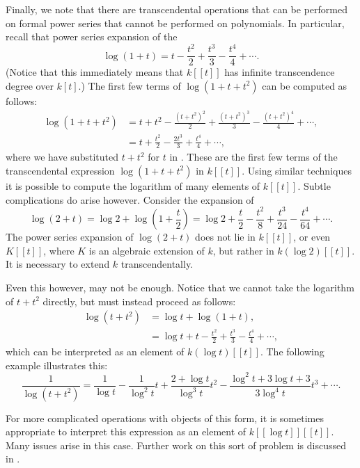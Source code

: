 \smallskip
Finally, we note that there are transcendental operations that can be
performed on formal power series that cannot be performed on
polynomials.  In particular, recall that power series expansion of the
\begin{equation} \label{Series:Log:Eq}
\log (1 + t) = t - \frac{t^2}{2} + \frac{t^3}{3} - \frac{t^4}{4} +
\cdots.
\end{equation}
(Notice that this immediately means that $k[[t]]$ has infinite
transcendence degree over $k[t]$.)  The first few terms of $\log
(1+t+t^2)$ can be computed as follows:
\[
\begin{aligned}
\log (1 + t +t^2) & = t + t^2 - \frac{(t+t^2)^2}{2} + \frac{(t+t^2)^3}{3}
  - \frac{(t+t^2)^4}{4} + \cdots,\\
 & = t + \frac{t^2}{2} - \frac{2t^3}{3} + \frac{t^4}{4} + \cdots,
\end{aligned}
\]
where we have substituted $t+t^2$ for $t$ in .
These are the first few terms of the transcendental
expression $\log (1+t+t^2)$ in $k[[t]]$.  Using similar techniques it is
possible to compute the logarithm of many elements of $k[[t]]$.  Subtle
complications do arise however.  Consider the expansion of 
\[
\log(2+t) = \log 2 + \log (1 + \frac{t}{2}) = \log 2 + \frac{t}{2} -
\frac{t^2}{8} + \frac{t^3}{24} - \frac{t^4}{64} + \cdots.
\]
The power series expansion of $\log(2 + t)$ does not lie in $k[[t]]$,
or even $K[[t]]$, where $K$ is an algebraic extension of $k$, but
rather in $k(\log 2)[[t]]$.  It is necessary to extend $k$
transcendentally.

Even this however, may not be enough.  Notice that we cannot take the
logarithm of $t+t^2$ directly, but must instead proceed as follows:
\[
\begin{aligned}
\log (t + t^2) & = \log t + \log (1 + t), \\
  & = \log t + t - \frac{t^2}{2} + \frac{t^3}{3} - \frac{t^4}{4} +
\cdots,
\end{aligned}
\]
which can be interpreted as an element of $k(\log t)[[t]]$.  The following
example illustrates this:
\[
\frac{1}{\log (t + t^2)} = \frac{1}{\log t} -
\frac{1}{\log^2 t} t + \frac{2 + \log t}{\log^3 t} t^2
- \frac{\log^2 t + 3 \log t + 3}{3 \log^4 t} t^3
+ \cdots.
\]

For more complicated operations with objects of this form, it
is sometimes appropriate to interpret this expression as an element of
$k[[\log t]][[t]]$.  Many issues arise in this case.  Further
work on this sort of problem is discussed in \cite{Shackell90}.

